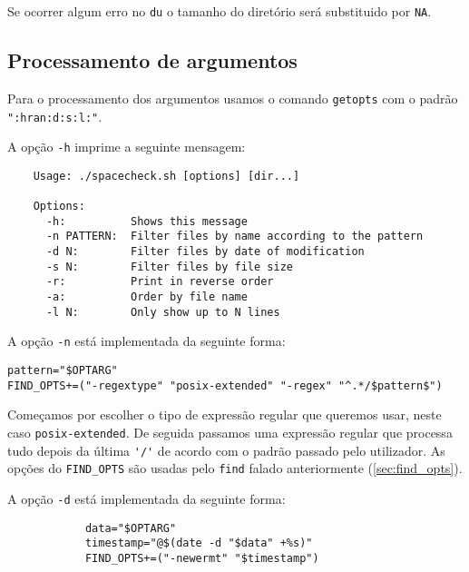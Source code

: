 Se ocorrer algum erro no \texttt{du} o tamanho do diretório será substituido por \Verb|NA|.

\subsection{Processamento de argumentos}\label{sec:args}

Para o processamento dos argumentos usamos o comando \texttt{getopts} com o padrão \texttt{":hran:d:s:l:"}.

A opção \Verb|-h| imprime a seguinte mensagem:

\begin{listing}[H]
  \begin{verbatim}
    Usage: ./spacecheck.sh [options] [dir...]

    Options:
      -h:          Shows this message
      -n PATTERN:  Filter files by name according to the pattern
      -d N:        Filter files by date of modification
      -s N:        Filter files by file size
      -r:          Print in reverse order
      -a:          Order by file name
      -l N:        Only show up to N lines
  \end{verbatim}
\end{listing}

A opção \Verb|-n| está implementada da seguinte forma:

\begin{listing}[H]
\begin{verbatim}
pattern="$OPTARG"
FIND_OPTS+=("-regextype" "posix-extended" "-regex" "^.*/$pattern$")
\end{verbatim}
\end{listing}

Começamos por escolher o tipo de expressão regular que queremos usar, neste caso \Verb|posix-extended|.
De seguida passamos uma expressão regular que processa tudo depois da última \Verb|'/'| de acordo com o padrão passado pelo utilizador.
As opções do \Verb|FIND_OPTS| são usadas pelo \Verb|find| falado anteriormente (\ref{sec:find_opts}).

A opção \Verb|-d| está implementada da seguinte forma:

\begin{listing}[H]
\begin{verbatim}
			data="$OPTARG"
			timestamp="@$(date -d "$data" +%s)"
			FIND_OPTS+=("-newermt" "$timestamp")
\end{verbatim}
\end{listing}

